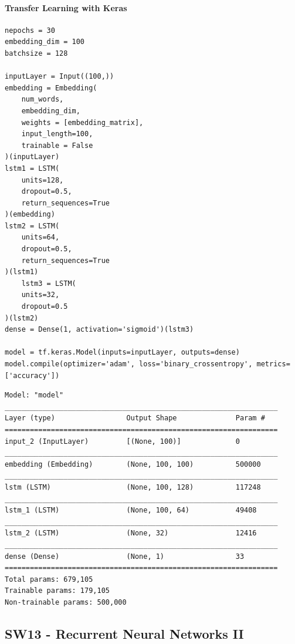 \documentclass[11pt]{article}
\begin{document}
\paragraph{Transfer Learning with Keras}
\begin{verbatim}
nepochs = 30
embedding_dim = 100
batchsize = 128

inputLayer = Input((100,))
embedding = Embedding(
	num_words,
	embedding_dim,
	weights = [embedding_matrix],
	input_length=100,
	trainable = False
)(inputLayer)
lstm1 = LSTM(
	units=128,
	dropout=0.5,
	return_sequences=True
)(embedding)
lstm2 = LSTM(
	units=64,
	dropout=0.5,
	return_sequences=True
)(lstm1)
	lstm3 = LSTM(
	units=32,
	dropout=0.5
)(lstm2)
dense = Dense(1, activation='sigmoid')(lstm3)

model = tf.keras.Model(inputs=inputLayer, outputs=dense)
model.compile(optimizer='adam', loss='binary_crossentropy', metrics=['accuracy'])
\end{verbatim}
\begin{small}
	\begin{verbatim}
Model: "model"
_________________________________________________________________
Layer (type)                 Output Shape              Param #   
=================================================================
input_2 (InputLayer)         [(None, 100)]             0         
_________________________________________________________________
embedding (Embedding)        (None, 100, 100)          500000    
_________________________________________________________________
lstm (LSTM)                  (None, 100, 128)          117248    
_________________________________________________________________
lstm_1 (LSTM)                (None, 100, 64)           49408     
_________________________________________________________________
lstm_2 (LSTM)                (None, 32)                12416     
_________________________________________________________________
dense (Dense)                (None, 1)                 33        
=================================================================
Total params: 679,105
Trainable params: 179,105
Non-trainable params: 500,000
	\end{verbatim}
\end{small}

\subsection{SW13 - Recurrent Neural Networks II}
\end{document}
